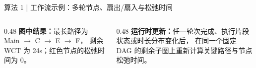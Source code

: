 \begin{frame}{算法 1 | 工作流示例：多轮节点、扇出/扇入与松弛时间}
{
  }

  \vspace{0.08cm}
  \scriptsize
  \begin{columns}[T,onlytextwidth]
    \begin{column}{0.48\textwidth}
      \textbf{图中结果：}最长路径为 Main $\rightarrow$ C $\rightarrow$ E $\rightarrow$ F，
      剩余 WCT 为 24s；红色节点的松弛时间为 0。
    \end{column}
    \begin{column}{0.48\textwidth}
      \textbf{运行时更新：}任一轮次完成、执行片段状态或时长分布变化后，
      在同一个固定 DAG 的剩余子图上重新计算关键路径与节点松弛时间。
    \end{column}
  \end{columns}
\end{frame}
